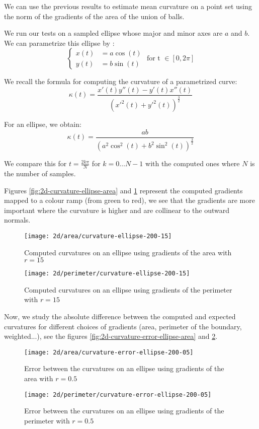 We can use the previous results to estimate mean curvature on a point set using
the norm of the gradients of the area of the union of balls.

We run our tests on a sampled ellipse whose major and minor axes are $ a $ and $
b $. We can parametrize this ellipse by :
$$
\begin{cases}
    x(t) &= a \cos (t) \\
    y(t) &= b \sin (t)
\end{cases}
\text{ for t } \in [ 0, 2\pi ]
$$

We recall the formula for computing the curvature of a parametrized curve:
$$ \kappa(t) = \frac{x'(t) y''(t) - y'(t) x''(t)}{(x'^2(t) +
    y'^2(t))^{\frac{3}{2}} } $$

For an ellipse, we obtain:
$$ \kappa(t) = \frac{ab}{(a^2 \cos^2(t) + b^2 \sin^2(t))^{\frac{3}{2}} } $$

We compare this for $ t = \frac{2 k \pi}{N} $ for $ k = 0 \ldots N - 1 $ with
the computed ones where $ N $ is the number of samples.

Figures \ref{fig:2d-curvature-ellipse-area} and \ref{fig:2d-curvature-ellipse-perimeter}
represent the computed gradients mapped to a colour ramp (from green to red), we
see that the gradients are more important where the curvature is higher and are
collinear to the outward normals.

\begin{figure}[h]
    \centering

    \texttt{[image: 2d/area/curvature-ellipse-200-15]}
    \caption{Computed curvatures on an ellipse using gradients of the area with $ r = 15 $}
    \label{fig:2d-curvature-ellipse-area}

    \texttt{[image: 2d/perimeter/curvature-ellipse-200-15]}
    \caption{Computed curvatures on an ellipse using gradients of the perimeter with $ r = 15 $}
    \label{fig:2d-curvature-ellipse-perimeter}
\end{figure}


Now, we study the absolute difference between the computed and expected
curvatures for different choices of gradients (area, perimeter of the boundary,
weighted...), see the figures \ref{fig:2d-curvature-error-ellipse-area} and
\ref{fig:2d-curvature-error-ellipse-perimeter}.

\begin{figure}[h]
    \centering

    \texttt{[image: 2d/area/curvature-error-ellipse-200-05]}
    \caption{Error between the curvatures on an ellipse using gradients of the area with $ r = 0.5 $}
    \label{fig:2d-curvature-error-ellipse-area}

    \texttt{[image: 2d/perimeter/curvature-error-ellipse-200-05]}
    \caption{Error between the curvatures on an ellipse using gradients of the perimeter with $ r = 0.5 $}
    \label{fig:2d-curvature-error-ellipse-perimeter}
\end{figure}

